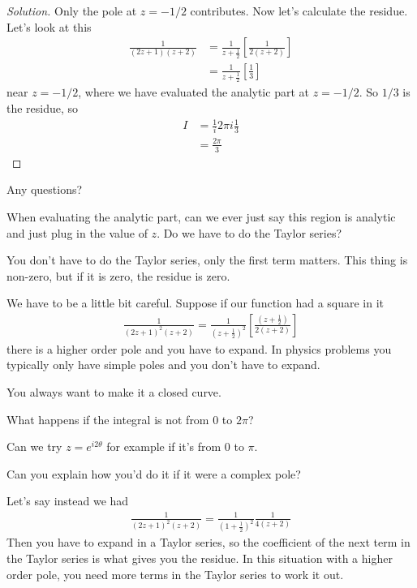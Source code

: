 \begin{proof}[Solution]
    Only the pole at $z=-1/2$ contributes.
    Now let's calculate the residue.
    Let's look at this
    \begin{align}
        \frac{1}{(2z + 1)(z + 2)} &=
        \frac{1}{z + \frac{1}{2}}\left[ 
            \frac{1}{2(z + 2)}
        \right]\\
        &= \frac{1}{z + \frac{1}{2}}\left[
            \frac{1}{3}
        \right]
    \end{align}
    near $z=-1/2$,
    where we have evaluated the analytic part at $z=-1/2$.
    So $1/3$ is the residue,
    so
    \begin{align}
        I &= \frac{1}{i}2\pi i \frac{1}{3}\\
        &= \frac{2\pi}{3}
    \end{align}
\end{proof}

Any questions?
\begin{question}
    When evaluating the analytic part,
    can we ever just say this region is analytic and just plug in the value of
    $z$.
    Do we have to do the Taylor series?
\end{question}
You don't have to do the Taylor series,
only the first term matters.
This thing is non-zero,
but if it is zero,
the residue is zero.

We have to be a little bit careful.
Suppose if our function had a square in it
\begin{align}
    \frac{1}{(2z + 1)^2(z + 2)}
    = \frac{1}{\left( z + \frac{1}{2} \right)^2}\left[
    \frac{(z + \frac{1}{2})}{2(z + 2)}
    \right]
\end{align}
there is a higher order pole and you have to expand.
In physics problems you typically only have simple poles
and you don't have to expand.

You always want to make it a closed curve.

\begin{question}
    What happens if the integral is not from $0$ to $2\pi$?
\end{question}
Can we try $z=e^{i2\theta}$ for example if it's from $0$ to $\pi$.

\begin{question}
    Can you explain how you'd do it if it were a complex pole?
\end{question}
Let's say instead we had
\begin{align}
    \frac{1}{(2z + 1)^2 (z + 2)}
    = \frac{1}{\left(1 + \frac{1}{2} \right)^2}
    \frac{1}{4\left(z + 2 \right)}
\end{align}
Then you have to expand in a Taylor series,
so the coefficient of the next term in the Taylor series is what gives you the
residue.
In this situation with a higher order pole,
you need more terms in the Taylor series to work it out.

